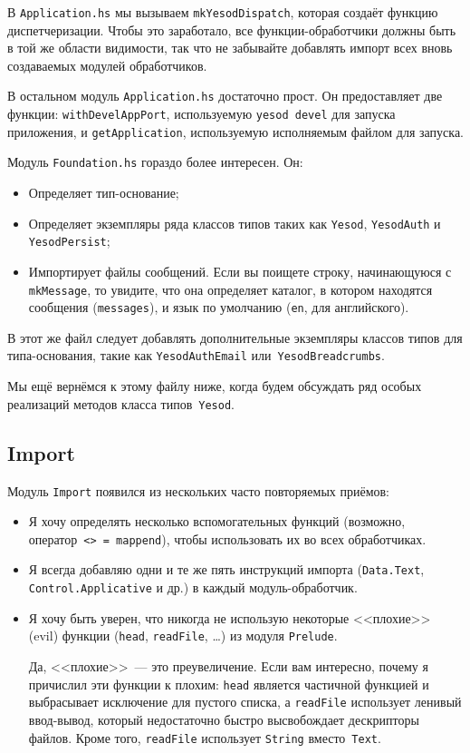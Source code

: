 В \texttt{Application.hs} мы вызываем \lstinline!mkYesodDispatch!, которая
создаёт функцию диспетчеризации.  Чтобы это заработало, все функции-обработчики
должны быть в той же области видимости, так что не забывайте добавлять импорт
всех вновь создаваемых модулей обработчиков.

В остальном модуль \texttt{Application.hs} достаточно прост. Он предоставляет
две функции: \lstinline!withDevelAppPort!, используемую \texttt{yesod devel} для
запуска приложения, и \lstinline!getApplication!, используемую исполняемым
файлом для запуска.

Модуль \texttt{Foundation.hs} гораздо более интересен. Он:
\begin{itemize}
  \item Определяет тип-основание;
  \item Определяет экземпляры ряда классов типов таких как \lstinline!Yesod!,
      \lstinline!YesodAuth! и \lstinline!YesodPersist!;
  \item Импортирует файлы сообщений. Если вы поищете строку, начинающуюся с
      \lstinline!mkMessage!, то увидите, что она определяет каталог, в котором
      находятся сообщения (\lstinline!messages!), и язык по умолчанию
      (\lstinline!en!, для английского).
\end{itemize}

В этот же файл следует добавлять дополнительные экземпляры классов типов для
типа-основания, такие как \lstinline!YesodAuthEmail!
или~\lstinline!YesodBreadcrumbs!.

Мы ещё вернёмся к этому файлу ниже, когда будем обсуждать ряд особых реализаций
методов класса типов~\lstinline!Yesod!.

\subsection{Import}
Модуль \lstinline!Import! появился из нескольких часто повторяемых приёмов:
\begin{itemize}
  \item Я хочу определять несколько вспомогательных функций (возможно,
      оператор~\lstinline!<> = mappend!), чтобы использовать их во всех
      обработчиках.
  \item Я всегда добавляю одни и те же пять инструкций импорта
      (\lstinline!Data.Text!, \lstinline!Control.Applicative! и др.) в каждый
      модуль-обработчик.
  \item Я хочу быть уверен, что никогда не использую некоторые <<плохие>> (evil)
      функции (\lstinline!head!, \lstinline!readFile!, \ldots) из модуля
      \lstinline!Prelude!.

    \begin{remark}
      Да, <<плохие>>~--- это преувеличение. Если вам интересно, почему я
      причислил эти функции к плохим: \lstinline!head! является частичной
      функцией и выбрасывает исключение для пустого списка, а
      \lstinline!readFile! использует ленивый ввод-вывод, который недостаточно
      быстро высвобождает дескрипторы файлов. Кроме того, \lstinline!readFile!
      использует \lstinline!String! вместо~\lstinline!Text!.
    \end{remark}
\end{itemize}

